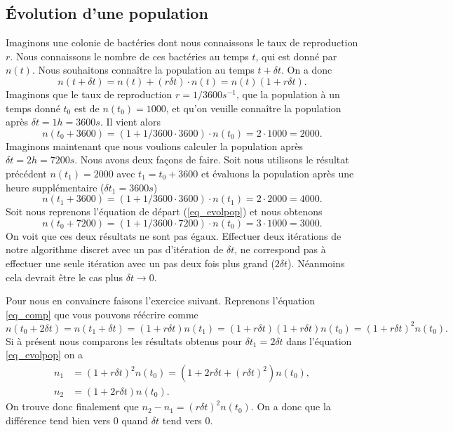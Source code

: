 \documentclass[a4paper,12pt]{book}
\begin{document}
\subsection{Évolution d'une population}

Imaginons une colonie de bactéries dont nous connaissons le taux de reproduction $r$. Nous connaissons le nombre de
ces bactéries au temps $t$, qui est donné par $n(t)$. Nous souhaitons connaître la population au temps $t+\delta t$.
On a donc
\begin{equation}
 n(t+\delta t)=n(t)+(r\delta t)\cdot n(t)=n(t)(1+r\delta t).\label{eq_evolpop}
\end{equation}
Imaginons que le taux de reproduction $r=1/3600 s^{-1}$, que la population à un temps donné $t_0$ est de $n(t_0)=1000$, et qu'on veuille connaître la population après 
$\delta t=1h=3600s$. Il vient alors
\begin{equation}
 n(t_0+3600)=(1+1/3600 \cdot 3600)\cdot n(t_0)=2\cdot1000=2000.
\end{equation}
Imaginons maintenant que nous voulions calculer la population après $\delta t=2h=7200s$. Nous avons deux façons de faire.
Soit nous utilisons le résultat précédent $n(t_1)=2000$ avec $t_1=t_0+3600$ et évaluons la population après une heure supplémentaire ($\delta t_1=3600s$)
\begin{equation}
 n(t_1+3600)=(1+1/3600 \cdot 3600)\cdot n(t_1)=2\cdot 2000=4000.\label{eq_comp}
\end{equation}
Soit nous reprenons l'équation de départ (\eqref{eq_evolpop}) et nous obtenons
\begin{equation}
 n(t_0+7200)=(1+1/3600 \cdot 7200)\cdot n(t_0)=3\cdot 1000=3000.
\end{equation}
On voit que ces deux résultats ne sont pas égaux. Effectuer deux itérations de notre algorithme discret avec un pas d'itération de $\delta t$,
ne correspond pas à effectuer une seule itération avec un pas deux fois plus grand ($2\delta t$). Néanmoins
cela devrait être le cas plus $\delta t\rightarrow 0$.

Pour nous en convaincre faisons l'exercice suivant. 
Reprenons l'équation \eqref{eq_comp} que vous pouvons réécrire comme
\begin{equation}
 n(t_0+2\delta t)=n(t_1+\delta t)=(1+r\delta t) n(t_1)=(1+r  \delta t)(1+r  \delta t) n(t_0)=(1+r\delta t)^2 n(t_0).
\end{equation}
Si à présent nous comparons les résultats obtenus pour $\delta t_1=2\delta t$ dans l'équation \eqref{eq_evolpop} on a
\begin{align}
 n_1&=(1+r\delta t)^2 n(t_0)=(1+2r\delta t+(r\delta t)^2) n(t_0),\\
 n_2&=(1+2r\delta t) n(t_0).
\end{align}
On trouve donc finalement que $n_2-n_1=(r\delta t)^2n(t_0)$. On a donc que la différence tend bien vers 0 quand $\delta t$ tend vers 0.
\end{document}
